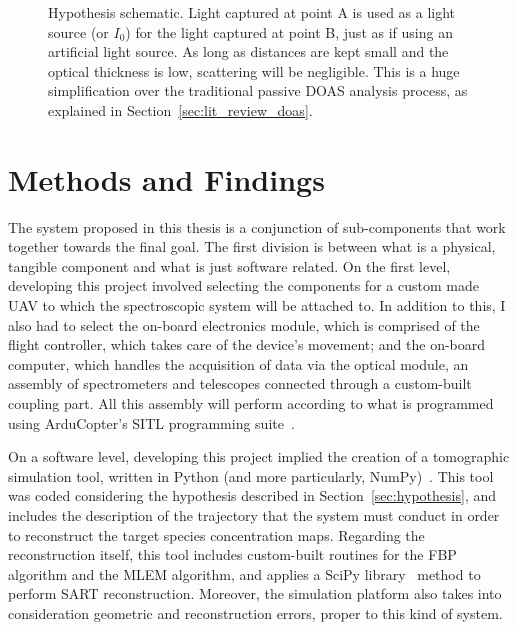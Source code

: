 \begin{figure}[htpb]
    \centering
    \missingfigure{}
    \caption{Hypothesis schematic. Light captured at point A is used as
        a light source (or $I_0$) for the light captured at point B,
        just as if using an artificial light source. As long as
        distances are kept small and the optical thickness is low,
        scattering will be negligible.  This is a huge simplification
        over the traditional passive \gls{DOAS} analysis process, as
        explained in Section~\ref{sec:lit_review_doas}.}
    \label{fig:hypothesis}
\end{figure}

\section{Methods and Findings}%
\label{sec:methods}


The system proposed in this thesis is a conjunction of sub-components
that work together towards the final goal. The first division is between
what is a physical, tangible component and what is just software
related. On the first level, developing this project involved selecting
the components for a custom made \gls{UAV} to which the spectroscopic
system will be attached to. In addition to this, I also had to select
the on-board electronics module, which is comprised of the flight
controller, which takes care of the device's movement; and the on-board
computer, which handles the acquisition of data via the optical module,
an assembly of spectrometers and telescopes connected through a
custom-built coupling part. All this assembly will perform according to
what is programmed using ArduCopter's SITL programming
suite~.

On a software level, developing this project implied the creation of a
tomographic simulation tool, written in Python (and more particularly,
NumPy)~\cite{Python, Oliphant2007}. This tool was coded considering the
hypothesis described in Section~\ref{sec:hypothesis}, and includes the
description of the trajectory that the system must conduct in order to
reconstruct the target species concentration maps. Regarding the
reconstruction itself, this tool includes custom-built routines for the
\gls{FBP} algorithm and the \gls{MLEM} algorithm, and applies a SciPy
library~ method to perform \gls{SART} reconstruction.
Moreover, the simulation platform also takes into consideration
geometric and reconstruction errors, proper to this kind of system.

